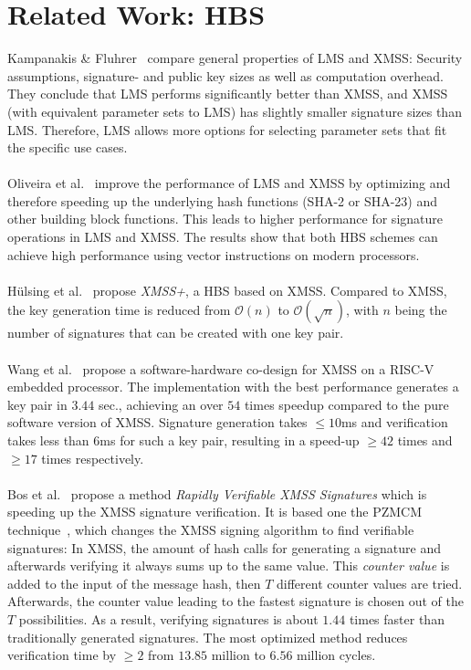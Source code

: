 \section{Related Work: HBS}
Kampanakis \& Fluhrer~\cite{comparison_xmss_lms_2017} compare general properties of LMS and XMSS: Security assumptions, signature- and public key sizes as well as computation overhead. They conclude that LMS performs significantly better than XMSS, and XMSS (with equivalent parameter sets to LMS) has slightly smaller signature sizes than LMS. Therefore, LMS allows more options for selecting parameter sets that fit the specific use cases.
\\ \\
Oliveira et al.~\cite{perform_HBS_lms_xmss_2017} improve the performance of LMS and XMSS by optimizing and therefore speeding up the underlying hash functions (SHA-2 or SHA-23) and other building block functions. This leads to higher performance for signature operations in LMS and XMSS. The results show that both HBS schemes can achieve high performance using vector instructions on modern processors.
\\ \\
Hülsing et al.~\cite{xmss+_2018} propose \textit{XMSS+}, a HBS based on XMSS. Compared to XMSS, the key generation time is reduced from $\mathcal{O}(n)$ to $\mathcal{O}(\sqrt{n})$, with $n$ being the number of signatures that can be created with one key pair.
\\  \\
Wang et al.~\cite{xmss_embedded_systems_2020} propose a software-hardware co-design for XMSS on a RISC-V embedded processor. The implementation with the best performance generates a key pair in $3.44$ sec., achieving an over $54$ times speedup compared to the pure software version of XMSS. Signature generation takes $\leq 10$ms and verification takes less than $6$ms for such a key pair, resulting in a speed-up $\geq 42$ times and $\geq 17$ times respectively. 
\\ \\
Bos et al.~\cite{xmss_rapidly_verif_sign_2020} propose a method \textit{Rapidly Verifiable XMSS Signatures} which is speeding up the XMSS signature verification. It is based one the PZMCM technique~\cite{PZMCM_speedup_wots_2018}, which changes the XMSS signing algorithm to find verifiable signatures: In XMSS, the amount of hash calls for generating a signature and afterwards verifying it always sums up to the same value. This \textit{counter value} is added to the input of the message hash, then $T$ different counter values are tried. Afterwards, the counter value leading to the fastest signature is chosen out of the $T$ possibilities. As a result, verifying signatures is about $1.44$ times faster than traditionally generated signatures. The most optimized method reduces verification time by $\geq 2$ from $13.85$ million to $6.56$ million cycles.
